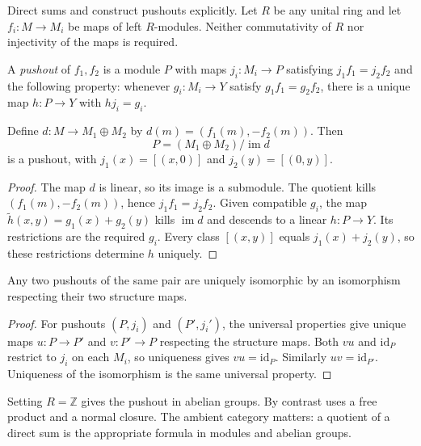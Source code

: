 Direct sums and  construct pushouts explicitly. Let $R$ be any unital ring and let $f_i:M\to M_i$ be maps of left $R$-modules. Neither commutativity of $R$ nor injectivity of the maps is required.

\begin{definition}\label{def-module-pushout}
A \emph{pushout} of $f_1,f_2$ is a module $P$ with maps $j_i:M_i\to P$ satisfying $j_1f_1=j_2f_2$ and the following property: whenever $g_i:M_i\to Y$ satisfy $g_1f_1=g_2f_2$, there is a unique map $h:P\to Y$ with $hj_i=g_i$.
\end{definition}

\begin{theorem}\label{thm-module-pushout-construction}
Define $d:M\to M_1\oplus M_2$ by $d(m)=(f_1(m),-f_2(m))$. Then
\[
P=(M_1\oplus M_2)/\operatorname{im}d
\]
is a pushout, with $j_1(x)=[(x,0)]$ and $j_2(y)=[(0,y)]$.
\end{theorem}
\begin{proof}\label{proof-module-pushout-construction}
The map $d$ is linear, so its image is a submodule. The quotient kills $(f_1(m),-f_2(m))$, hence $j_1f_1=j_2f_2$. Given compatible $g_i$, the map $\widetilde h(x,y)=g_1(x)+g_2(y)$ kills $\operatorname{im}d$ and descends to a linear $h:P\to Y$. Its restrictions are the required $g_i$. Every class $[(x,y)]$ equals $j_1(x)+j_2(y)$, so these restrictions determine $h$ uniquely.
\end{proof}

\begin{proposition}\label{prop-module-pushout-uniqueness}
Any two pushouts of the same pair are uniquely isomorphic by an isomorphism respecting their two structure maps.
\end{proposition}
\begin{proof}\label{proof-module-pushout-uniqueness}
For pushouts $(P,j_i)$ and $(P',j_i')$, the universal properties give unique maps $u:P\to P'$ and $v:P'\to P$ respecting the structure maps. Both $vu$ and $\mathrm{id}_P$ restrict to $j_i$ on each $M_i$, so uniqueness gives $vu=\mathrm{id}_P$. Similarly $uv=\mathrm{id}_{P'}$. Uniqueness of the isomorphism is the same universal property.
\end{proof}

\begin{remark}\label{remark-abelian-pushout}
Setting $R=\mathbb Z$ gives the pushout in abelian groups. By contrast  uses a free product and a normal closure. The ambient category matters: a quotient of a direct sum is the appropriate formula in modules and abelian groups.
\end{remark}
